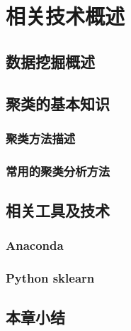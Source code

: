 \section{相关技术概述}

\subsection{数据挖掘概述}
\subsection{聚类的基本知识}
\subsubsection{聚类方法描述}
\subsubsection{常用的聚类分析方法}

\subsection{相关工具及技术}
\subsubsection{Anaconda}
\subsubsection{Python sklearn}

\subsection{本章小结}

\setcounter{table}{0}
\setcounter{figure}{0}
\setcounter{equation}{0}

